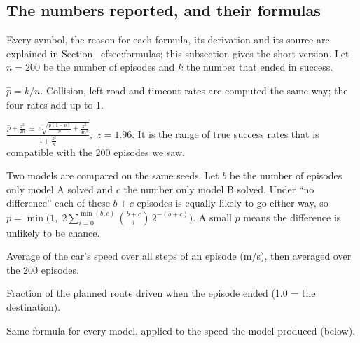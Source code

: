 \documentclass[11pt,a4paper]{article}
\begin{document}
\subsection{The numbers reported, and their formulas}
Every symbol, the reason for each formula, its derivation and its source are explained in Section~
ef{sec:formulas}; this subsection gives the short version.
Let $n=200$ be the number of episodes and $k$ the number that ended in success.
\begin{description}[leftmargin=3.2cm,style=nextline]
\item[Success rate] $\hat p=k/n$. Collision, left-road and timeout rates are computed the same way; the four rates add up to 1.
\item[95\% interval (Wilson)] $\displaystyle \frac{\hat p+\frac{z^2}{2n}\;\pm\;z\sqrt{\frac{\hat p(1-\hat p)}{n}+\frac{z^2}{4n^2}}}{1+\frac{z^2}{n}},\; z=1.96$. It is the range of true success rates that is compatible with the 200 episodes we saw.
\item[Paired comparison (exact McNemar test)] Two models are compared on the same seeds. Let $b$ be the number of episodes only model A solved and $c$ the number only model B solved. Under ``no difference'' each of these $b+c$ episodes is equally likely to go either way, so $p=\min\!\Big(1,\;2\sum_{i=0}^{\min(b,c)}\binom{b+c}{i}\,2^{-(b+c)}\Big)$. A small $p$ means the difference is unlikely to be chance.
\item[Mean speed] Average of the car's speed over all steps of an episode (m/s), then averaged over the 200 episodes.
\item[Route completion] Fraction of the planned route driven when the episode ended (1.0 = the destination).
\item[Estimated energy] Same formula for every model, applied to the speed the model produced (below).
\end{description}
\end{document}

